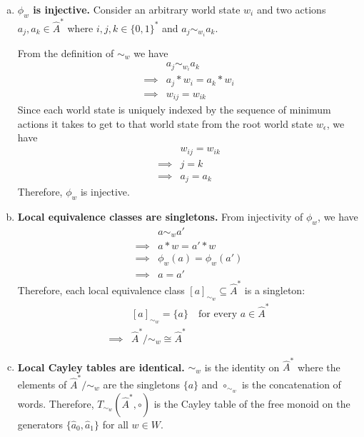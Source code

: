 \begin{proofE}
\begin{enumerate}[(1)]
\begin{enumerate}[(a)]
        \item \textbf{$\phi_{w}$ is injective.}
        Consider an arbitrary world state $w_{i}$ and two actions $a_{j}, a_{k} \in \hat{A}^{*}$ where $i,j,k \in \{0,1\}^{*}$ and $a_{j} \sim_{w_{i}} a_{k}$.

        From the definition of $\sim_{w}$ we have
        \begin{align}
            & a_{j} \sim_{w_{i}} a_{k} \\
            \implies & a_{j} \ast w_{i} = a_{k} \ast w_{i} \\
            \implies & w_{ij} = w_{ik}
        \end{align}
        Since each world state is uniquely indexed by the sequence of minimum actions it takes to get to that world state from the root world state $w_{\epsilon}$, we have
        \begin{align}
            & w_{ij} = w_{ik} \\
            \implies & j = k \\
            \implies & a_{j} = a_{k}
        \end{align}
        Therefore, $\phi_{w}$ is injective.

        \item \textbf{Local equivalence classes are singletons.}
        From injectivity of $\phi_{w}$, we have
        \begin{align}
            & a \sim_{w} a' \\
            \implies & a \ast w = a' \ast w \\
            \implies & \phi_{w}(a) = \phi_{w}(a') \\
            \implies & a = a'
        \end{align}
        Therefore, each local equivalence class $[a]_{\sim_{w}} \subseteq \hat{A}^{*}$ is a singleton:
        \begin{align}
            & [a]_{\sim_{w}} = \{a\} \quad \text{for every $a \in \hat{A}^{*}$} \\
            \implies & \hat{A}^{*}/\sim_{w} \cong \hat{A}^{*}
        \end{align}

        \item \textbf{Local Cayley tables are identical.}
        $\sim_{w}$ is the identity on $\hat{A}^{*}$ where the elements of $\hat{A}^{*}/\sim_{w}$ are the singletons $\{a\}$ and $\circ_{\sim_{w}}$ is the concatenation of words.
        Therefore, $T_{\sim_{w}}(\hat{A}^{*}, \circ)$ is the Cayley table of the free monoid on the generators $\{\hat{a}_{0}, \hat{a}_{1}\}$ for all $w \in W$.
    \end{enumerate}
\end{enumerate}
\end{proofE}

